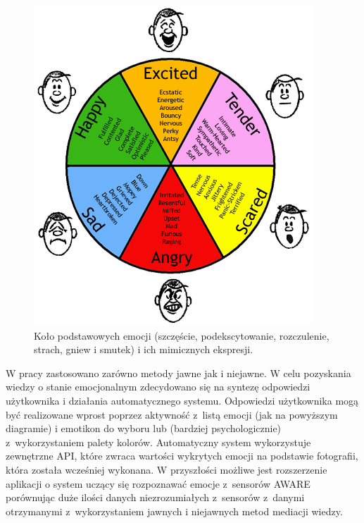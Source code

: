\begin{figure}[H]
	\centering
	\includegraphics[scale=1]{rozdzial2/ModelEkmana.png}
	\caption{Koło podstawowych emocji (szczęście, podekscytowanie, rozczulenie, strach, gniew i smutek) i ich mimicznych ekspresji.}
\end{figure}

W pracy zastosowano zarówno metody jawne jak i niejawne. W celu pozyskania wiedzy o stanie emocjonalnym zdecydowano się na syntezę odpowiedzi użytkownika i działania automatycznego systemu. Odpowiedzi użytkownika mogą być realizowane wprost poprzez aktywność z~listą emocji (jak na powyższym diagramie) i emotikon do wyboru lub (bardziej psychologicznie) z~wykorzystaniem palety kolorów. Automatyczny system wykorzystuje zewnętrzne API, które zwraca wartości wykrytych emocji na podstawie fotografii, która została wcześniej wykonana. W przyszłości możliwe jest rozszerzenie aplikacji o system uczący się rozpoznawać emocje z~sensorów AWARE porównując duże ilości danych niezrozumiałych z~sensorów z~danymi otrzymanymi z~wykorzystaniem jawnych i niejawnych metod mediacji wiedzy.
